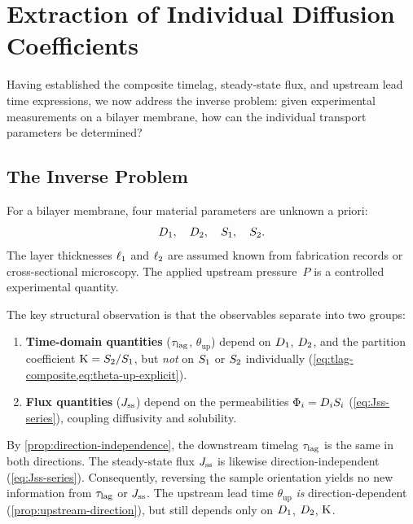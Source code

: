 \section{Extraction of Individual Diffusion Coefficients}
\label{sec:extraction}

Having established the composite timelag, steady-state flux, and upstream lead
time expressions, we now address the inverse problem: given experimental
measurements on a bilayer membrane, how can the individual transport
parameters be determined?

\subsection{The Inverse Problem}
\label{sec:inverse-problem}

For a bilayer membrane, four material parameters are unknown a priori:
\begin{equation}
  \label{eq:unknowns}
  D_{1},\quad D_{2},\quad S_{1},\quad S_{2}.
\end{equation}
The layer thicknesses $\ell_{1}$ and $\ell_{2}$ are assumed known from fabrication
records or cross-sectional microscopy.  The applied upstream pressure~$P$ is a
controlled experimental quantity.

The key structural observation is that the observables separate into two
groups:
\begin{enumerate}
  \item \textbf{Time-domain quantities} ($\tau_{\mathrm{lag}}$, $\theta_{\mathrm{up}}$)
        depend on $D_{1}$, $D_{2}$, and the partition coefficient
        $\mathrm{K} = S_{2}/S_{1}$, but \emph{not} on $S_{1}$ or $S_{2}$
        individually (\cref{eq:tlag-composite,eq:theta-up-explicit}).
  \item \textbf{Flux quantities} ($J_{\mathrm{ss}}$) depend on the permeabilities
        $\Phi_i = D_{i}S_{i}$ (\cref{eq:Jss-series}), coupling diffusivity
        and solubility.
\end{enumerate}

\begin{remark}
By \cref{prop:direction-independence}, the downstream timelag $\tau_{\mathrm{lag}}$ is the
same in both directions.  The steady-state flux $J_{\mathrm{ss}}$ is likewise
direction-independent (\cref{eq:Jss-series}).  Consequently, reversing the
sample orientation yields no new information from $\tau_{\mathrm{lag}}$ or $J_{\mathrm{ss}}$.
The upstream lead time $\theta_{\mathrm{up}}$ \emph{is}
direction-dependent (\cref{prop:upstream-direction}), but still depends only on
$D_{1}$, $D_{2}$, $\mathrm{K}$.
\end{remark}

